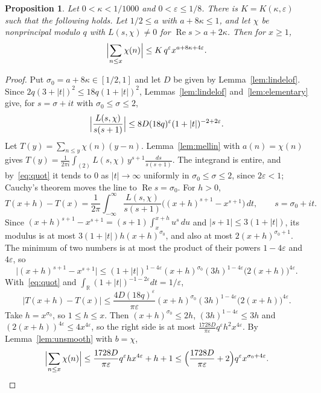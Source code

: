 \documentclass[12pt]{amsart}
\newtheorem{proposition}[theorem]{Proposition}
\theoremstyle{remark}
\renewcommand{\Re}{\operatorname{Re}}
\newcommand{\R}{\mathbb{R}}
\begin{document}
\begin{proposition}\label{prop:charsum}
Let $0<\kappa<1/1000$ and $0<\varepsilon\le1/8$. There is $K=K(\kappa,\varepsilon)$ such that the
following holds. Let $1/2\le a$ with $a+8\kappa\le1$, and let $\chi$ be nonprincipal modulo $q$
with $L(s,\chi)\ne0$ for $\Re s>a+2\kappa$. Then for $x\ge1$,
\[
  \Bigl|\sum_{n\le x}\chi(n)\Bigr|\le K\,q^\varepsilon x^{a+8\kappa+4\varepsilon}.
\]
\end{proposition}

\begin{proof}
Put $\sigma_0=a+8\kappa\in[1/2,1]$ and let $D$ be given by Lemma~\ref{lem:lindelof}. Since
$2q(3+|t|)^2\le18q(1+|t|)^2$, Lemmas~\ref{lem:lindelof} and~\ref{lem:elementary} give, for
$s=\sigma+it$ with $\sigma_0\le\sigma\le2$,
\begin{equation}\label{eq:quot}
  \Bigl|\frac{L(s,\chi)}{s(s+1)}\Bigr|\le8D(18q)^\varepsilon(1+|t|)^{-2+2\varepsilon}.
\end{equation}
Let $T(y)=\sum_{n\le y}\chi(n)(y-n)$. Lemma~\ref{lem:mellin} with $a(n)=\chi(n)$ gives
$T(y)=\frac1{2\pi i}\int_{(2)}L(s,\chi)\,y^{s+1}\frac{ds}{s(s+1)}$. The integrand is entire, and
by~\eqref{eq:quot} it tends to $0$ as $|t|\to\infty$ uniformly in $\sigma_0\le\sigma\le2$, since
$2\varepsilon<1$; Cauchy's theorem moves the line to $\Re s=\sigma_0$. For $h>0$,
\[
  T(x+h)-T(x)=\frac1{2\pi}\int_{-\infty}^{\infty}\frac{L(s,\chi)}{s(s+1)}
  \bigl((x+h)^{s+1}-x^{s+1}\bigr)\,dt,\qquad s=\sigma_0+it.
\]
Since $(x+h)^{s+1}-x^{s+1}=(s+1)\int_x^{x+h}u^s\,du$ and $|s+1|\le3(1+|t|)$, its modulus is at
most $3(1+|t|)h(x+h)^{\sigma_0}$, and also at most $2(x+h)^{\sigma_0+1}$. The minimum of two
numbers is at most the product of their powers $1-4\varepsilon$ and $4\varepsilon$, so
\[
  \bigl|(x+h)^{s+1}-x^{s+1}\bigr|\le(1+|t|)^{1-4\varepsilon}(x+h)^{\sigma_0}(3h)^{1-4\varepsilon}
  \bigl(2(x+h)\bigr)^{4\varepsilon}.
\]
With~\eqref{eq:quot} and $\int_\R(1+|t|)^{-1-2\varepsilon}dt=1/\varepsilon$,
\[
  |T(x+h)-T(x)|\le\frac{4D(18q)^\varepsilon}{\pi\varepsilon}(x+h)^{\sigma_0}(3h)^{1-4\varepsilon}
  \bigl(2(x+h)\bigr)^{4\varepsilon}.
\]
Take $h=x^{\sigma_0}$, so $1\le h\le x$. Then $(x+h)^{\sigma_0}\le2h$, $(3h)^{1-4\varepsilon}\le3h$
and $(2(x+h))^{4\varepsilon}\le4x^{4\varepsilon}$, so the right side is at most
$\frac{1728D}{\pi\varepsilon}q^\varepsilon h^2x^{4\varepsilon}$. By Lemma~\ref{lem:unsmooth}
with $b=\chi$,
\[
  \Bigl|\sum_{n\le x}\chi(n)\Bigr|\le\frac{1728D}{\pi\varepsilon}q^\varepsilon hx^{4\varepsilon}+h+1
  \le\Bigl(\frac{1728D}{\pi\varepsilon}+2\Bigr)q^\varepsilon x^{\sigma_0+4\varepsilon}.
  \qedhere
\]
\end{proof}
\end{document}

